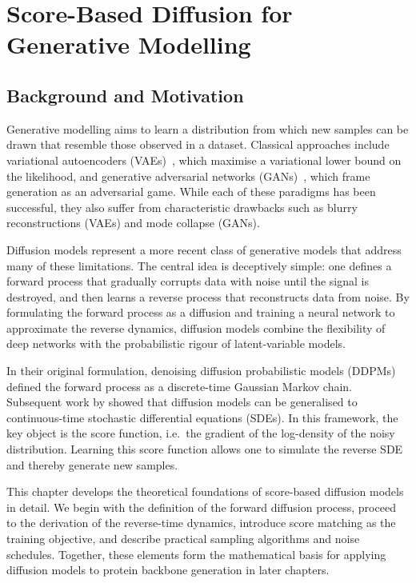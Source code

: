 \documentclass[a4paper,12pt]{article}
\begin{document}
\clearpage

\section{Score-Based Diffusion for Generative Modelling}\label{sec:SBD}
\subsection{Background and Motivation}
Generative modelling aims to learn a distribution from which new samples can be drawn that resemble those observed in a dataset. Classical approaches include variational autoencoders (VAEs)~\citep{kingma2022AutoEncodingVariationalBayes}, which maximise a variational lower bound on the likelihood, and generative adversarial networks (GANs)~\citep{goodfellow2020GenerativeAdversarialNetworks}, which frame generation as an adversarial game. While each of these paradigms has been successful, they also suffer from characteristic drawbacks such as blurry reconstructions (VAEs) and mode collapse (GANs).

Diffusion models represent a more recent class of generative models that address many of these limitations. The central idea is deceptively simple: one defines a forward process that gradually corrupts data with noise until the signal is destroyed, and then learns a reverse process that reconstructs data from noise. By formulating the forward process as a diffusion and training a neural network to approximate the reverse dynamics, diffusion models combine the flexibility of deep networks with the probabilistic rigour of latent-variable models. 

In their original formulation, denoising diffusion probabilistic models (DDPMs)~\citep{hoDenoisingDiffusionProbabilistic2020} defined the forward process as a discrete-time Gaussian Markov chain. Subsequent work by \citet{song2021ScoreBasedGenerativeModeling} showed that diffusion models can be generalised to continuous-time stochastic differential equations (SDEs). In this framework, the key object is the score function, i.e.~the gradient of the log-density of the noisy distribution. Learning this score function allows one to simulate the reverse SDE and thereby generate new samples.

This chapter develops the theoretical foundations of score-based diffusion models in detail. We begin with the definition of the forward diffusion process, proceed to the derivation of the reverse-time dynamics, introduce score matching as the training objective, and describe practical sampling algorithms and noise schedules. Together, these elements form the mathematical basis for applying diffusion models to protein backbone generation in later chapters.
\end{document}
